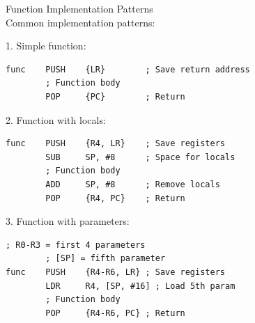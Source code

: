 \begin{KR}{Function Implementation Patterns}\\
Common implementation patterns:

1. Simple function:
\begin{lstlisting}[language=armasm, style=basesmol]
func    PUSH    {LR}        ; Save return address
        ; Function body
        POP     {PC}        ; Return
\end{lstlisting}

2. Function with locals:
\begin{lstlisting}[language=armasm, style=basesmol]
func    PUSH    {R4, LR}    ; Save registers
        SUB     SP, #8      ; Space for locals
        ; Function body
        ADD     SP, #8      ; Remove locals
        POP     {R4, PC}    ; Return
\end{lstlisting}

3. Function with parameters:
\begin{lstlisting}[language=armasm, style=basesmol]
        ; R0-R3 = first 4 parameters
        ; [SP] = fifth parameter
func    PUSH    {R4-R6, LR} ; Save registers
        LDR     R4, [SP, #16] ; Load 5th param
        ; Function body
        POP     {R4-R6, PC} ; Return
\end{lstlisting}
\end{KR}




